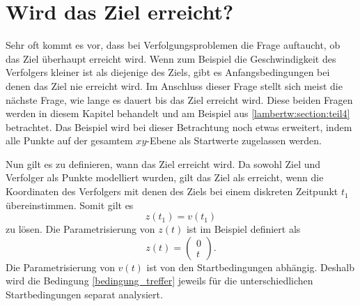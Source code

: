 %
%
%
\section{Wird das Ziel erreicht?
\label{lambertw:section:Wird_das_Ziel_erreicht}}
%
Sehr oft kommt es vor, dass bei Verfolgungsproblemen die Frage auftaucht, ob das Ziel überhaupt erreicht wird.
Wenn zum Beispiel die Geschwindigkeit des Verfolgers kleiner ist als diejenige des Ziels, gibt es Anfangsbedingungen bei denen das Ziel nie erreicht wird.
Im Anschluss dieser Frage stellt sich meist die nächste Frage, wie lange es dauert bis das Ziel erreicht wird.
Diese beiden Fragen werden in diesem Kapitel behandelt und am Beispiel aus \ref{lambertw:section:teil4} betrachtet.
Das Beispiel wird bei dieser Betrachtung noch etwas erweitert, indem alle Punkte auf der gesamtem $xy$-Ebene als Startwerte zugelassen werden.

Nun gilt es zu definieren, wann das Ziel erreicht wird.
Da sowohl Ziel und Verfolger als Punkte modelliert wurden, gilt das Ziel als erreicht, wenn die Koordinaten des Verfolgers mit denen des Ziels bei einem diskreten Zeitpunkt $t_1$ übereinstimmen.
Somit gilt es
%
\begin{equation}
    z(t_1)=v(t_1)
    \label{bedingung_treffer}
\end{equation}
%
zu lösen.
Die Parametrisierung von $z(t)$ ist im Beispiel definiert als
\begin{equation}
    z(t)
    =
    \begin{pmatrix} 0 \\ t \end{pmatrix}\text{.}
\end{equation}
%
Die Parametrisierung von $v(t)$ ist von den Startbedingungen abhängig. Deshalb wird die Bedingung \eqref{bedingung_treffer} jeweils für die unterschiedlichen Startbedingungen separat analysiert.
%
